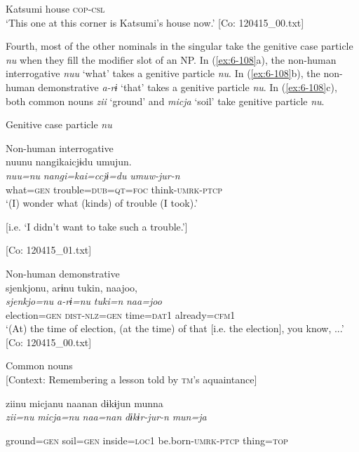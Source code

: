 \begin{table}
      Katsumi  house  \textsc{cop}-\textsc{csl}\\
\glt ‘This one at this corner is Katsumi’s house now.’ [Co: 120415\_00.txt]
\z

  Fourth, most of the other nominals in the singular take the genitive case particle \textit{nu} when they fill the modifier slot of an NP. In (\ref{ex:6-108}a), the non-human interrogative \textit{nuu} ‘what’ takes a genitive particle \textit{nu}. In (\ref{ex:6-108}b), the non-human demonstrative \textit{a-rɨ} ‘that’ takes a genitive particle \textit{nu}. In (\ref{ex:6-108}c), both common nouns \textit{zii} ‘ground’ and \textit{micja} ‘soil’ take genitive particle \textit{nu}.

\ea\label{ex:6-108}
  Genitive case particle \textit{nu}

 \ea Non-human interrogative\\
{\TM}
\glll  nuunu  nangikaicjɨdu  umujun.\\
\textit{nuu=nu}  \textit{nangi=kai=ccjɨ=du}  \textit{umuw-jur-n}\\
what=\textsc{gen}  trouble=\textsc{dub}=\textsc{qt}=\textsc{foc}  think-\textsc{umrk}-\textsc{ptcp}\\
\glt ‘(I) wonder what (kinds) of trouble (I took).’

[i.e. ‘I didn’t want to take such a trouble.’]

      [Co: 120415\_01.txt]
\z

\ex Non-human demonstrative\\
{\TM}
\glll  {\textbar}sjenkjo{\textbar}nu,  arɨnu  tukin,  naajoo,\\
\textit{sjenkjo=nu}  \textit{a-rɨ=nu}  \textit{tuki=n}  \textit{naa=joo}\\
election=\textsc{gen}  \textsc{dist}-\textsc{nlz}=\textsc{gen}  time=\textsc{dat}1  already=\textsc{cfm}1\\
\glt ‘(At) the time of election, (at the time) of that [i.e. the election], you know, ...’ [Co: 120415\_00.txt]
\z

\ex Common nouns\\{}
[Context: Remembering a lesson told by \textsc{tm}’s aquaintance]

{\TM}
\glll ziinu  micjanu  naanan  dɨkɨjun  munna\\

      \textit{zii=nu}  \textit{micja=nu}  \textit{naa=nan}  \textit{dɨkɨr-jur-n}  \textit{mun=ja}

      ground=\textsc{gen}  soil=\textsc{gen}  inside=\textsc{loc}1  be.born-\textsc{umrk}-\textsc{ptcp}  thing=\textsc{top}


\end{table}

